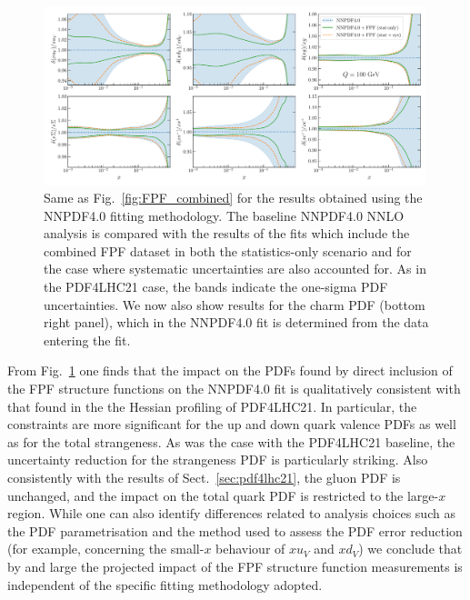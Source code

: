 \begin{figure}[t]
\centering
\includegraphics[width=0.99\textwidth]{plots/NNPDF40-FPFall-q100gev.pdf}
\caption{
  Same as Fig.~\ref{fig:FPF_combined} for the results obtained
  using the NNPDF4.0 fitting methodology.
  The baseline NNPDF4.0 NNLO analysis is compared
  with the results of the fits which include the combined FPF dataset
  in both the statistics-only scenario and for the case
  where systematic uncertainties are also accounted for.
  As in the PDF4LHC21 case, the bands indicate the one-sigma PDF uncertainties.
  We now also show results for the charm PDF (bottom right panel), which
  in the NNPDF4.0 fit is determined from the data entering the fit.
%
}
\label{fig:NNPDF40_baseline}
\end{figure}

From  Fig.~\ref{fig:NNPDF40_baseline} one finds that
the impact on the PDFs found by direct inclusion of the FPF structure
functions on the NNPDF4.0 fit is qualitatively consistent with
that found in the the Hessian profiling of PDF4LHC21.
%
In particular, the constraints are more significant for the up and down
quark valence PDFs as well as for the total strangeness.
%
As was the case with the PDF4LHC21 baseline, the uncertainty reduction
for the strangeness PDF is particularly
striking.
%
Also consistently with the results of Sect.~\ref{sec:pdf4lhc21}, the gluon
PDF is unchanged, and the impact on the total quark PDF
is restricted to the large-$x$ region.
%
While one can also identify differences related to analysis choices
such as the PDF parametrisation and the method used to assess the PDF
error reduction (for example, concerning the small-$x$ behaviour of $xu_V$ and $xd_V$)
we conclude that by and large the projected impact of the FPF structure function
measurements is independent of the specific fitting methodology adopted.

